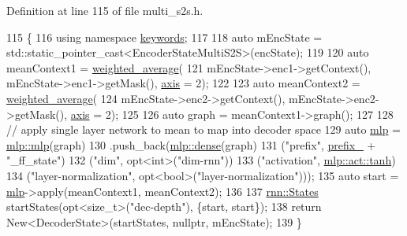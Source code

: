 Definition at line 115 of file multi\+\_\+s2s.\+h.


\begin{DoxyCode}
115                                                                    \{
116     \textcolor{keyword}{using namespace }\hyperlink{namespacekeywords}{keywords};
117 
118     \textcolor{keyword}{auto} mEncState = std::static\_pointer\_cast<EncoderStateMultiS2S>(encState);
119 
120     \textcolor{keyword}{auto} meanContext1 = \hyperlink{namespacemarian_a8ccb9507a69a32ecd48410fd1557f209}{weighted\_average}(
121         mEncState->enc1->getContext(), mEncState->enc1->getMask(), \hyperlink{namespacemarian_1_1keywords_ace9158eabbddaca833133f12da98b9d6}{axis} = 2);
122 
123     \textcolor{keyword}{auto} meanContext2 = \hyperlink{namespacemarian_a8ccb9507a69a32ecd48410fd1557f209}{weighted\_average}(
124         mEncState->enc2->getContext(), mEncState->enc2->getMask(), \hyperlink{namespacemarian_1_1keywords_ace9158eabbddaca833133f12da98b9d6}{axis} = 2);
125 
126     \textcolor{keyword}{auto} graph = meanContext1->graph();
127 
128     \textcolor{comment}{// apply single layer network to mean to map into decoder space}
129     \textcolor{keyword}{auto} \hyperlink{namespacemarian_1_1mlp_a4d0fe240d31bdc33bcbdb5401de49e27}{mlp} = \hyperlink{namespacemarian_1_1mlp_a4d0fe240d31bdc33bcbdb5401de49e27}{mlp::mlp}(graph)
130                .push\_back(\hyperlink{namespacemarian_1_1mlp_a8c25b1e343bf78e66cd9e33e607efeb5}{mlp::dense}(graph)
131                           (\textcolor{stringliteral}{"prefix"}, \hyperlink{classmarian_1_1DecoderBase_a043a90801b6bda9a45e309607136e947}{prefix\_} + \textcolor{stringliteral}{"\_ff\_state"})
132                           (\textcolor{stringliteral}{"dim"}, opt<int>(\textcolor{stringliteral}{"dim-rnn"}))
133                           (\textcolor{stringliteral}{"activation"}, \hyperlink{namespacemarian_1_1mlp_ac16d27a877d16d7394f2057aee439d72a5c0dbba3a6ee4ac0eb26cfee75ccb8b4}{mlp::act::tanh})
134                           (\textcolor{stringliteral}{"layer-normalization"}, opt<bool>(\textcolor{stringliteral}{"layer-normalization"})));
135     \textcolor{keyword}{auto} start = \hyperlink{namespacemarian_1_1mlp_a4d0fe240d31bdc33bcbdb5401de49e27}{mlp}->apply(meanContext1, meanContext2);
136 
137     \hyperlink{namespaceamunmt_a4fe2912e208820f8217fbcf229ebacf7}{rnn::States} startStates(opt<size\_t>(\textcolor{stringliteral}{"dec-depth"}), \{start, start\});
138     \textcolor{keywordflow}{return} New<DecoderState>(startStates, \textcolor{keyword}{nullptr}, mEncState);
139   \}
\end{DoxyCode}


